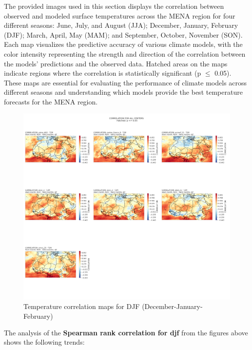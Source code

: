 The provided images used in this section displays the correlation between observed and modeled surface temperatures across the MENA region for four different seasons: June, July, and August (JJA); December, January, February (DJF); March, April, May (MAM); and September, October, November (SON). Each map visualizes the predictive accuracy of various climate models, with the color intensity representing the strength and direction of the correlation between the models' predictions and the observed data. Hatched areas on the maps indicate regions where the correlation is statistically significant (p \(\leq\) 0.05). These maps are essential for evaluating the performance of climate models across different seasons and understanding which models provide the best temperature forecasts for the MENA region.
\begin{figure}[H]
    \centering
    \includegraphics[width=1\linewidth]{plots/det/corr/CORR_djf_t2m.png}
    \caption{Temperature correlation maps for DJF (December-January-February)}
\end{figure}
The analysis of the \textbf{Spearman rank correlation for djf } from the figures above shows the following trends:

